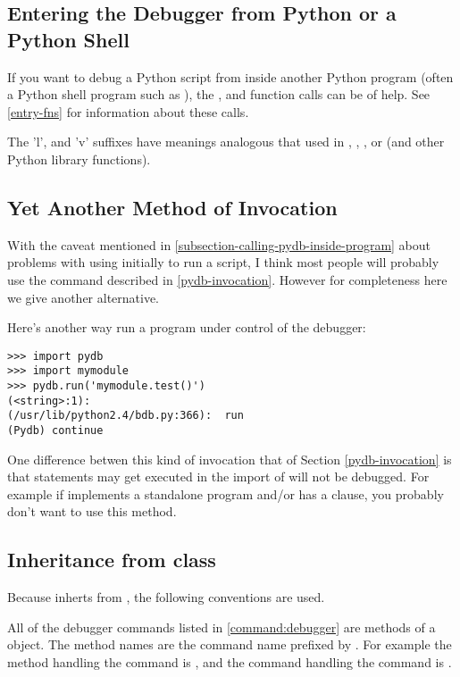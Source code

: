 \subsection{Entering the Debugger from Python or a Python
  Shell}\label{subsection-entering-pydb-from-python}

If you want to debug a Python script from inside another Python
program (often a Python shell program such as
), the 
, and  function calls can be of help. See
\ref{entry-fns} for information about these calls. 

The 'l', and 'v' suffixes have meanings analogous that used in
, , , or
 (and other Python library functions).

\subsection{Yet Another Method of Invocation}

With the caveat mentioned in
\ref{subsection-calling-pydb-inside-program} about problems with using
 initially to run a script, I think most people will
probably use the  command described in
\ref{pydb-invocation}. However for completeness here we give another
alternative.

Here's another way run a program under control of the debugger:

\begin{verbatim}
>>> import pydb
>>> import mymodule
>>> pydb.run('mymodule.test()')
(<string>:1): 
(/usr/lib/python2.4/bdb.py:366):  run
(Pydb) continue
\end{verbatim}

One difference betwen this kind of invocation that of Section
\ref{pydb-invocation} is that statements may get executed in the
import of  will not be debugged. For example if
 implements a standalone program and/or has a
 clause, you probably don't want to use
this method.


\subsection{Inheritance from class }
Because  inherts from , the following
conventions are used. 

All of the debugger commands listed in \ref{command:debugger} are methods
of a  object. The method names are the command name prefixed by
. For example the method handling the  command is
, and the command handling the  command is
. 

